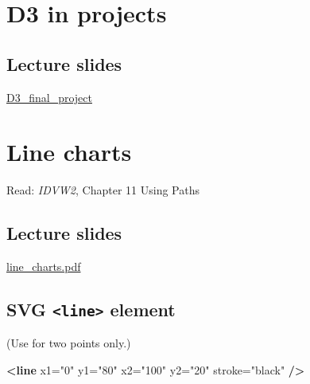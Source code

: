\documentclass[openany]{book}
\newenvironment{Shaded}{\begin{snugshade}}{\end{snugshade}}
\newcommand{\KeywordTok}[1]{\textcolor[rgb]{0.13,0.29,0.53}{\textbf{#1}}}
\newcommand{\OtherTok}[1]{\textcolor[rgb]{0.56,0.35,0.01}{#1}}
\newcommand{\StringTok}[1]{\textcolor[rgb]{0.31,0.60,0.02}{#1}}
\begin{document}
\hypertarget{d3-in-projects}{%
\chapter{D3 in projects }\label{d3-in-projects}}

\hypertarget{lecture-slides-5}{%
\section{Lecture slides }\label{lecture-slides-5}}

\href{pdfs/D3_final_project.pdf}{D3\_final\_project}

\hypertarget{line-charts}{%
\chapter{Line charts }\label{line-charts}}

Read: \emph{IDVW2}, Chapter 11 Using Paths

\hypertarget{lecture-slides-6}{%
\section{Lecture slides }\label{lecture-slides-6}}

\href{pdfs/line_charts.pdf}{line\_charts.pdf}

\hypertarget{svg-line-element}{%
\section{\texorpdfstring{SVG \texttt{\textless{}line\textgreater{}} element}{SVG \textless{}line\textgreater{} element}}\label{svg-line-element}}

(Use for two points only.)

\begin{Shaded}
\begin{Highlighting}[]
\KeywordTok{<line}\OtherTok{ x1=}\StringTok{"0"}\OtherTok{ y1=}\StringTok{"80"}\OtherTok{ x2=}\StringTok{"100"}\OtherTok{ y2=}\StringTok{"20"}\OtherTok{ stroke=}\StringTok{"black"} \KeywordTok{/>}
\end{Highlighting}
\end{Shaded}
\end{document}
